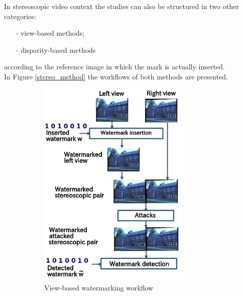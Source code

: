 In stereoscopic video context the studies can also be structured in two other categories:
\begin{itemize}
\item[-] view-based methods;
\item[-] disparity-based methods
\end{itemize}
according to the reference image in which the mark is actually inserted.\\
In Figure \ref{stereo_method} the workflows of both methods are presented.
\begin{figure}[h!]
\centering
\begin{subfigure}[]{0.4\textwidth}
\centering
\includegraphics[width=0.8\textwidth]{./img/views_domain.jpeg}
\caption{\small{View-based watermarking workflow}}
\label{fig:view}
\end{subfigure}%
~ %
\begin{subfigure}[]{0.4\textwidth}
\centering

\end{subfigure}
\end{figure}
